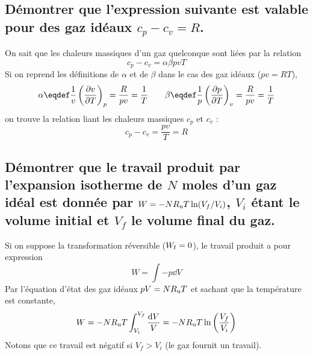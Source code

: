 \subsection{Démontrer que l'expression suivante est valable pour des gaz idéaux $c_p-c_v = R$.}
On sait que les chaleurs massiques d'un gaz quelconque sont liées par la relation 
\[ c_p-c_v = \alpha\beta pvT \]
Si on reprend les définitions de $\alpha$ et de $\beta$ dans le cas des gaz idéaux ($pv=RT$),
\[ \alpha \eqdef \frac{1}{v}\thermodiff{v}{T}{p} = \frac{R}{pv} = \frac{1}{T}
\qquad \beta \eqdef \frac{1}{p}\thermodiff{p}{T}{v} = \frac{R}{pv} = \frac{1}{T} \]
on trouve la relation liant les chaleurs massiques $c_p$ et $c_v$ :
\begin{equation} c_p-c_v = \frac{pv}{T} = R \end{equation}

\subsection{Démontrer que le travail produit par l'expansion isotherme de $N$ moles d'un gaz idéal
est donnée par $ W = -NR_{\mathrm{u}} T\ln(V_f/V_i) $, $V_i$ étant le volume initial
et $V_f$ le volume final du gaz.}
Si on suppose la transformation réversible ($W_{\mathrm{f}}=0$), le travail produit a pour expression
\[ W = \int -p\dd{V} \]
Par l'équation d'état des gaz idéaux $pV = N R_{\mathrm{u}} T$ et sachant que la température est constante,
\[ W = -NR_{\mathrm{u}} T\int_{V_i}^{V_f} \frac{\dd{V}}{V} = -NR_{\mathrm{u}} T\ln\left(\frac{V_f}{V_i}\right) \]
Notons que ce travail est négatif si $V_f > V_i$ (le gaz fournit un travail).

\iffalse
\begin{equation} W = -NR_uT\ln\left(\frac{V_f}{V_i}\right) \label{eq:q2_8}\end{equation}
où $V_i$ est le volume inital et $V_f$ le volume final de gaz.
Prenons pour exemple un piston sur lequel une pression est excercée par le milieu extérieur :
\begin{equation} \delta W = F_\text{ext}dx = P_\text{ext}Sdx = P_\text{ext}dV \qquad \text{avec} \qquad (dV>0)\end{equation} 
Le travail est fourni par le système contre $F_\text{ext}$, donc $\delta W$ doit être négatif. On a donc 
\begin{equation} \delta W = -P_\text{ext}dV \end{equation}
Si l'expansion est réversible, à chaque instant la pression intérieure est ajustée à la pression extérieure. Donc $P_\text{ext} = P_\text{int}$ à chaque instant :
\begin{equation} \delta W = -P_\text{int}dV = -NR_uT\frac{dV}{V} \end{equation}
Après intégration, on trouve l'équation \ref{eq:q2_8}. On observe donc que pour une détente isotherme : $W<0$, le travail est fourni par le système.
\fi

